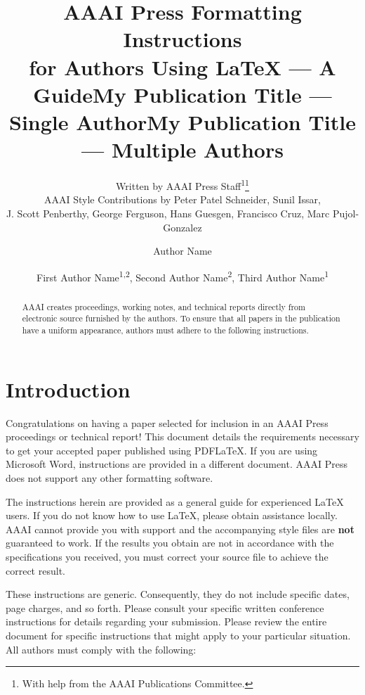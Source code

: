 \documentclass[letterpaper]{article} %
\title{AAAI Press Formatting Instructions \\for Authors Using \LaTeX{} --- A Guide}
\author{
    Written by AAAI Press Staff\textsuperscript{\rm 1}\thanks{With help from the AAAI Publications Committee.}\\
    AAAI Style Contributions by Peter Patel Schneider,
    Sunil Issar,\\
    J. Scott Penberthy,
    George Ferguson,
    Hans Guesgen,
    Francisco Cruz\equalcontrib\corresponding,
    Marc Pujol-Gonzalez\equalcontrib\corresponding
}
\title{My Publication Title --- Single Author}
\author {
    Author Name
}
\title{My Publication Title --- Multiple Authors}
\author {
    First Author Name\textsuperscript{\rm 1,\rm 2}\equalcontrib,
    Second Author Name\textsuperscript{\rm 2}\equalcontrib,
    Third Author Name\textsuperscript{\rm 1}\corresponding
}
\begin{document}
\maketitle

\begin{abstract}
AAAI creates proceedings, working notes, and technical reports directly from electronic source furnished by the authors. To ensure that all papers in the publication have a uniform appearance, authors must adhere to the following instructions.
\end{abstract}

\begin{links}
\end{links}

\section{Introduction}
Congratulations on having a paper selected for inclusion in an AAAI Press proceedings or technical report! This document details the requirements necessary to get your accepted paper published using PDF\LaTeX{}. If you are using Microsoft Word, instructions are provided in a different document. AAAI Press does not support any other formatting software.

The instructions herein are provided as a general guide for experienced \LaTeX{} users. If you do not know how to use \LaTeX{}, please obtain assistance locally. AAAI cannot provide you with support and the accompanying style files are \textbf{not} guaranteed to work. If the results you obtain are not in accordance with the specifications you received, you must correct your source file to achieve the correct result.

These instructions are generic. Consequently, they do not include specific dates, page charges, and so forth. Please consult your specific written conference instructions for details regarding your submission. Please review the entire document for specific instructions that might apply to your particular situation. All authors must comply with the following:
\end{document}

